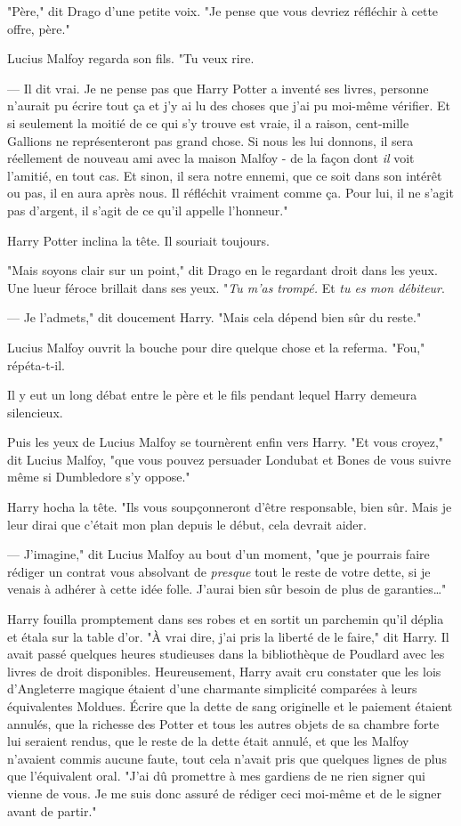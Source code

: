 "Père," dit Drago d'une petite voix. "Je pense que vous devriez réfléchir à cette offre, père."

Lucius Malfoy regarda son fils. "Tu veux rire.

--- Il dit vrai. Je ne pense pas que Harry Potter a inventé ses livres, personne n'aurait pu écrire tout ça et j'y ai lu des choses que j'ai pu moi-même vérifier. Et si seulement la moitié de ce qui s'y trouve est vraie, il a raison, cent-mille Gallions ne représenteront pas grand chose. Si nous les lui donnons, il sera réellement de nouveau ami avec la maison Malfoy - de la façon dont \emph{il} voit l'amitié, en tout cas. Et sinon, il sera notre ennemi, que ce soit dans son intérêt ou pas, il en aura après nous. Il réfléchit vraiment comme ça. Pour lui, il ne s'agit pas d'argent, il s'agit de ce qu'il appelle l'honneur."

Harry Potter inclina la tête. Il souriait toujours.

"Mais soyons clair sur un point," dit Drago en le regardant droit dans les yeux. Une lueur féroce brillait dans ses yeux. "\emph{Tu m'as trompé.} Et \emph{tu es mon débiteur}.

--- Je l'admets," dit doucement Harry. "Mais cela dépend bien sûr du reste."

Lucius Malfoy ouvrit la bouche pour dire quelque chose et la referma. "Fou," répéta-t-il.

Il y eut un long débat entre le père et le fils pendant lequel Harry demeura silencieux.

Puis les yeux de Lucius Malfoy se tournèrent enfin vers Harry. "Et vous croyez," dit Lucius Malfoy, "que vous pouvez persuader Londubat et Bones de vous suivre même si Dumbledore s'y oppose."

Harry hocha la tête. "Ils vous soupçonneront d'être responsable, bien sûr. Mais je leur dirai que c'était mon plan depuis le début, cela devrait aider.

--- J'imagine," dit Lucius Malfoy au bout d'un moment, "que je pourrais faire rédiger un contrat vous absolvant de \emph{presque} tout le reste de votre dette, si je venais à adhérer à cette idée folle. J'aurai bien sûr besoin de plus de garanties…"

Harry fouilla promptement dans ses robes et en sortit un parchemin qu'il déplia et étala sur la table d'or. "À vrai dire, j'ai pris la liberté de le faire," dit Harry. Il avait passé quelques heures studieuses dans la bibliothèque de Poudlard avec les livres de droit disponibles. Heureusement, Harry avait cru constater que les lois d'Angleterre magique étaient d'une charmante simplicité comparées à leurs équivalentes Moldues. Écrire que la dette de sang originelle et le paiement étaient annulés, que la richesse des Potter et tous les autres objets de sa chambre forte lui seraient rendus, que le reste de la dette était annulé, et que les Malfoy n'avaient commis aucune faute, tout cela n'avait pris que quelques lignes de plus que l'équivalent oral. "J'ai dû promettre à mes gardiens de ne rien signer qui vienne de vous. Je me suis donc assuré de rédiger ceci moi-même et de le signer avant de partir."


